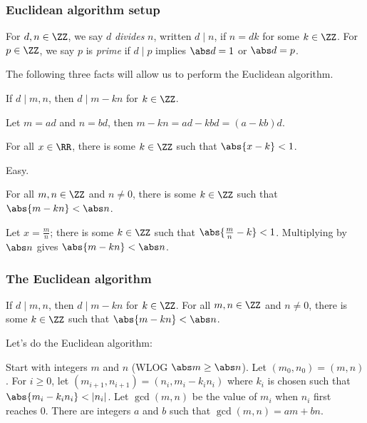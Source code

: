 \documentclass{beamer}
\begin{document}
\begin{frame}
	\frametitle{Euclidean algorithm setup}
	\begin{itemize}
		\ii For $d,n \in \ZZ$, we say $d$ \emph{divides} $n$, written $d \mid n$, if $n = dk$ for some $k \in \ZZ$.
		\ii For $p \in \ZZ$, we say $p$ is \emph{prime} if $d \mid p$ implies $\abs d = 1$ or $\abs d = p$.
	\end{itemize}

	The following three facts will allow us to perform the Euclidean algorithm.
	
	\begin{block}{}
		If $d \mid m,n$, then $d \mid m - kn$ for $k \in \ZZ$.
	\end{block}
	Let $m = ad$ and $n = bd$, then $m - kn = ad - kbd = (a - kb)d$.

	\begin{block}{}
		For all $x \in \RR$, there is some $k \in \ZZ$ such that $\abs{x - k} < 1$.
	\end{block}
	Easy.
	
	\begin{block}{}
		For all $m,n \in \ZZ$ and $n \neq 0$, there is some $k \in \ZZ$ such that $\abs{m - kn} < \abs n$.
	\end{block}
	Let $x = \frac mn$; there is some $k \in \ZZ$ such that $\abs{\frac mn - k} < 1$. Multiplying by $\abs n$ gives $\abs{m - kn} < \abs n$.
\end{frame}

\begin{frame}
	\frametitle{The Euclidean algorithm}
	\begin{itemize}
		\ii If $d \mid m,n$, then $d \mid m - kn$ for $k \in \ZZ$.
		\ii For all $m,n \in \ZZ$ and $n \neq 0$, there is some $k \in \ZZ$ such that $\abs{m - kn} < \abs n$.
	\end{itemize}

	Let's do the Euclidean algorithm:
	\begin{itemize}
		\ii Start with integers $m$ and $n$ (WLOG $\abs m \ge \abs n$).
		\ii Let $(m_0,n_0) = (m,n)$.
        \ii For $i \ge 0$, let $(m_{i + 1},n_{i + 1}) = (n_i,m_i - k_in_i)$ where $k_i$ is chosen such that $\abs{m_i - k_in_i} < \lvert n_i\rvert$.
		\ii Let $\gcd(m,n)$ be the value of $m_i$ when $n_i$ first reaches $0$.
		\ii There are integers $a$ and $b$ such that $\gcd(m,n) = am + bn$.
	\end{itemize}
\end{frame}
\end{document}
